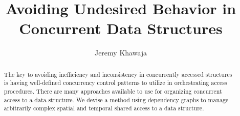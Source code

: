 \documentclass[english]{article}
\begin{document}
	
\hypersetup{
	linktoc=all,     %
	linkcolor=blue,  %
}

\title{Avoiding Undesired Behavior in Concurrent Data Structures}
\author{Jeremy Khawaja}
\maketitle

\begin{abstract}
		The key to avoiding inefficiency and inconsistency in concurrently accessed structures is having well-defined concurrency control patterns to utilize in  orchestrating access procedures. There are many approaches available to use for organizing concurrent access to a data structure. We devise a method using dependency graphs to manage arbitrarily complex spatial and temporal shared access to a data structure.
\end{abstract}
\twocolumn



%
%
%


\end{document}
